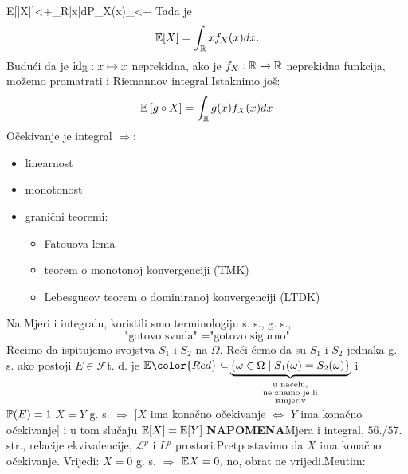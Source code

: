 \documentclass{article}
\newcommand{\id}{\operatorname{id}}
\begin{document}
E[|X|]<+\infty\Leftrightarrow\int_{\Bbb R}|x|d\Bbb P_X(x)\Leftrightarrow{}_{}<+\infty\] Tada je \[\Bbb E[X]=\int_{\Bbb R}xf_X(x)dx.\] Budući da je \(\id_{\Bbb R}:x\mapsto x\) neprekidna, ako je \(f_X:\Bbb R\to\Bbb R\) neprekidna funkcija, možemo promatrati i Riemannov integral.\newline Istaknimo još: \[\Bbb E\left[g\circ X\right]=\int_{\Bbb R}g(x)f_X(x)dx\] Očekivanje je integral \(\Rightarrow\):
\begin{itemize}
    \item[\ding{113}] linearnost
    \item[\ding{113}] monotonost
    \item[\ding{113}] granični teoremi:\begin{itemize}
        \item[\ding{95}] Fatouova lema
        \item[\ding{95}] teorem o monotonoj konvergenciji (TMK)
        \item[\ding{95}] Lebesgueov teorem o dominiranoj konvergenciji (LTDK)
    \end{itemize}
\end{itemize}
Na Mjeri i integralu, koristili smo terminologiju s. s., g. s., \[\text{"gotovo svuda" }=\text{"gotovo sigurno"}\] Recimo da ispitujemo svojstva \(S_1\) i \(S_2\) na \(\Omega.\) Reći ćemo da su \(S_1\) i \(S_2\) jednaka g. s. ako postoji \(E\in\mathcal F\)\newline t. d. je \(\Bbb E{\color{Red}\subseteq}\underbrace{\left\{\omega\in\Omega\mid S_1(\omega)=S_2(\omega)\right\}}_{\substack{\text{u načelu,}\\\text{ne znamo je li}\\\text{izmjeriv}}}\) i \(\Bbb P(E)=1.\)\newline \(X=Y\) g. s. \(\Rightarrow\) [\(X\) ima konačno očekivanje \(\Leftrightarrow\) \(Y\) ima konačno očekivanje] i u tom slučaju \(\Bbb E[X]=\Bbb E[Y].\)\newline\newline {}\textbf{NAPOMENA}\newline Mjera i integral, \(56./57.\) str., relacije ekvivalencije, \(\mathcal L^p\) i \(L^p\) prostori.\newline\newline Pretpostavimo da \(X\) ima konačno očekivanje. Vrijedi: \(X=0\) g. s. \(\Rightarrow\) \(\Bbb EX=0,\) no, obrat ne vrijedi.\newline Me\dj{}utim:\newline
\end{document}
